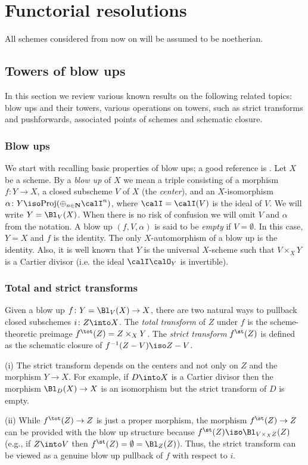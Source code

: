 \documentclass[10pt]{../fichiers-configuration-latex/smfart}
\begin{document}
\section{Functorial resolutions}\label{8-functorressec} All schemes
considered from now on will be assumed to be noetherian.

\subsection{Towers of blow ups}\label{8-blowtowersec} In this
section we review various known results on the following related
topics: blow ups and their towers, various operations on towers,
such as strict transforms and pushforwards, associated points of
schemes and schematic closure.

\subsubsection{Blow ups}\label{8-blowsec} We start with
recalling basic properties of blow ups; a good reference is
\cite[\S1]{Nagata@Conrad}. Let $X$ be a scheme. By a \textit{blow
up} of $X$ we mean a triple consisting of a morphism $f\colon Y
\to X$, a closed subscheme $V$ of $X$ (the \textit{center}), and
an $X$-isomorphism $\alpha\colon Y\iso \mathrm{Proj}(\oplus_{n
\in \mathbf{N}}\calI^n)$, where $\calI=\calI(V)$ is the ideal
of $V$.  We will write $Y=\Bl_V(X)$. When there is no risk of
confusion we will omit $V$ and $\alpha$ from the notation. A blow
up $(f,V,\alpha)$ is said to be \textit{empty} if $V=\emptyset$. In
this case, $Y=X$ and $f$ is the identity. The only $X$-automorphism
of a blow up is the identity. Also, it is well known that $Y$ is
the universal $X$-scheme such that $V\times_XY$ is a Cartier divisor
(i.e. the ideal $\calI\calO_Y$ is invertible).

\subsubsection{Total and strict transforms}\label{8-transformsec}
Given a blow up $f{\colon}Y=\Bl_V(X)\to X$, there are two natural
ways to pullback closed subschemes $i{\colon}Z\into X$. The {\em
total transform} of $Z$ under $f$ is the scheme-theoretic preimage
$f^\tot(Z)=Z\times_XY$. The {\em strict transform} $f^\st(Z)$
is defined as the schematic closure of $f^{-1}(Z-V)\iso Z-V$.

\begin{remark2}\label{8-strictrem} (i) The strict transform depends
on the centers and not only on $Z$ and the morphism $Y\to X$. For
example, if $D\into X$ is a Cartier divisor then the morphism
$\Bl_D(X)\to X$ is an isomorphism but the strict transform of $D$
is empty.

(ii) While $f^\tot(Z)\to Z$ is just a proper morphism, the morphism
$f^\st(Z)\to Z$ can be provided with the blow up structure because
$f^\st(Z)\iso\Bl_{V\times_XZ}(Z)$ (e.g., if $Z\into V$ then
$f^\st(Z)=\emptyset=\Bl_Z(Z)$). Thus, the strict transform can be
viewed as a genuine blow up pullback of $f$ with respect to $i$.
\end{remark2}
\end{document}
